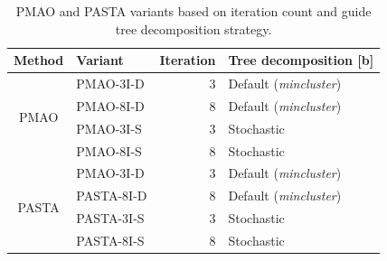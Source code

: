 \begin{table}[!htbp]
  \centering
  \caption{PMAO and PASTA variants based on iteration count and guide tree decomposition strategy.}
    \begin{tabular}{c|l|r|l}
    \multicolumn{1}{l|}{Method} & Variant & \multicolumn{1}{l|}{Iteration} & Tree decomposition [b]\\
    \hline
    \multirow{4}{*}{PMAO} & PMAO-3I-D  & 3     & Default (\textit{mincluster}) \\
\cline{2-4}          & 	PMAO-8I-D  & 8     & Default (\textit{mincluster}) \\
\cline{2-4}          & PMAO-3I-S  & 3     & Stochastic \\
\cline{2-4}          & PMAO-8I-S  & 8     & Stochastic\\
\hline \hline
    \multirow{4}{*}{PASTA} & PMAO-3I-D  & 3     & Default (\textit{mincluster}) \\
\cline{2-4}          & PASTA-8I-D  & 8     & Default (\textit{mincluster}) \\
\cline{2-4}          & PASTA-3I-S  & 3     & Stochastic \\
\cline{2-4}          & PASTA-8I-S  & 8     & Stochastic\\
    \hline
    \end{tabular}%
  \label{tab:variants}%
\end{table}%




